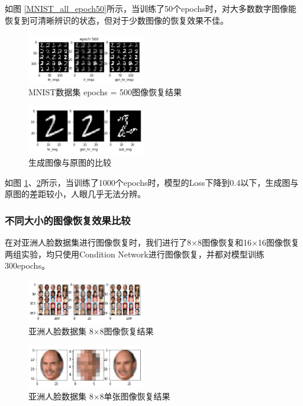 如图 \ref{MNIST_all_epoch50}所示，当训练了50个epochs时，对大多数数字图像能恢复到可清晰辨识的状态，但对于少数图像的恢复效果不佳。

\begin{figure}[htp]
    \centering
    \includegraphics[width=0.46\textwidth]{figures/MNIST_all_epoch500}
    \caption{MNIST数据集 epochs = 500图像恢复结果}
    \label{MNIST_all_epoch500}
\end{figure}

\begin{figure}[htp]
    \centering
    \includegraphics[width=0.46\textwidth]{figures/MNIST_sub}
    \caption{生成图像与原图的比较}
    \label{MNIST_sub}
\end{figure}

如图 \ref{MNIST_all_epoch500}、\ref{MNIST_sub}所示，当训练了1000个epochs时，模型的Loss下降到0.4以下，生成图与原图的差距较小，人眼几乎无法分辨。

\subsubsection{不同大小的图像恢复效果比较}
在对亚洲人脸数据集进行图像恢复时，我们进行了8×8图像恢复和16×16图像恢复两组实验，均只使用Condition Network进行图像恢复，并都对模型训练300epochs。

\begin{figure}[htp]
    \centering
    \includegraphics[width=0.46\textwidth]{figures/person_all_8}
    \caption{亚洲人脸数据集 8×8图像恢复结果}
    \label{person_all_8}
\end{figure}

\begin{figure}[htp]
    \centering
    \includegraphics[width=0.46\textwidth]{figures/person_8}
    \caption{亚洲人脸数据集 8×8单张图像恢复结果}
    \label{person_8}
\end{figure}

